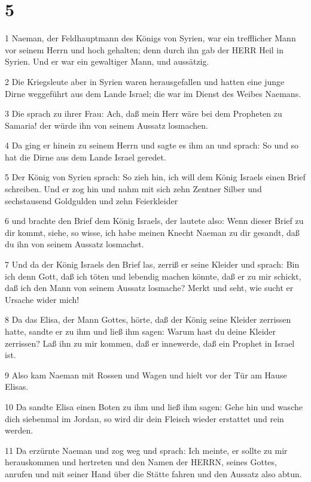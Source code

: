 \chapter{5}

\par 1 Naeman, der Feldhauptmann des Königs von Syrien, war ein trefflicher Mann vor seinem Herrn und hoch gehalten; denn durch ihn gab der HERR Heil in Syrien. Und er war ein gewaltiger Mann, und aussätzig.
\par 2 Die Kriegsleute aber in Syrien waren herausgefallen und hatten eine junge Dirne weggeführt aus dem Lande Israel; die war im Dienst des Weibes Naemans.
\par 3 Die sprach zu ihrer Frau: Ach, daß mein Herr wäre bei dem Propheten zu Samaria! der würde ihn von seinem Aussatz losmachen.
\par 4 Da ging er hinein zu seinem Herrn und sagte es ihm an und sprach: So und so hat die Dirne aus dem Lande Israel geredet.
\par 5 Der König von Syrien sprach: So zieh hin, ich will dem König Israels einen Brief schreiben. Und er zog hin und nahm mit sich zehn Zentner Silber und sechstausend Goldgulden und zehn Feierkleider
\par 6 und brachte den Brief dem König Israels, der lautete also: Wenn dieser Brief zu dir kommt, siehe, so wisse, ich habe meinen Knecht Naeman zu dir gesandt, daß du ihn von seinem Aussatz losmachst.
\par 7 Und da der König Israels den Brief las, zerriß er seine Kleider und sprach: Bin ich denn Gott, daß ich töten und lebendig machen könnte, daß er zu mir schickt, daß ich den Mann von seinem Aussatz losmache? Merkt und seht, wie sucht er Ursache wider mich!
\par 8 Da das Elisa, der Mann Gottes, hörte, daß der König seine Kleider zerrissen hatte, sandte er zu ihm und ließ ihm sagen: Warum hast du deine Kleider zerrissen? Laß ihn zu mir kommen, daß er innewerde, daß ein Prophet in Israel ist.
\par 9 Also kam Naeman mit Rossen und Wagen und hielt vor der Tür am Hause Elisas.
\par 10 Da sandte Elisa einen Boten zu ihm und ließ ihm sagen: Gehe hin und wasche dich siebenmal im Jordan, so wird dir dein Fleisch wieder erstattet und rein werden.
\par 11 Da erzürnte Naeman und zog weg und sprach: Ich meinte, er sollte zu mir herauskommen und hertreten und den Namen der HERRN, seines Gottes, anrufen und mit seiner Hand über die Stätte fahren und den Aussatz also abtun.
